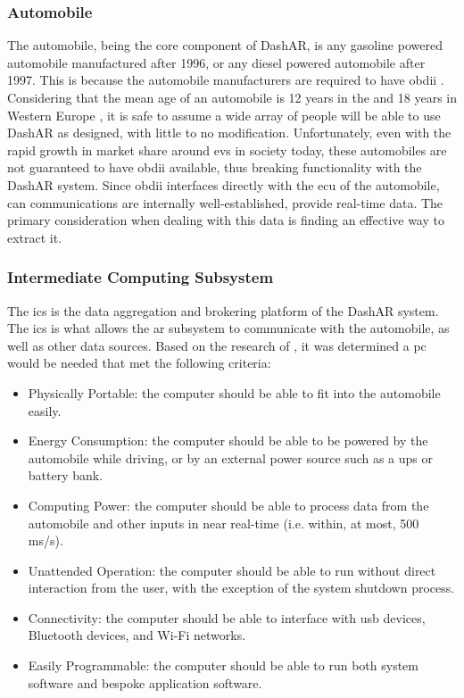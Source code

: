         \subsubsection{Automobile}
            \par The automobile, being the core component of DashAR, is any gasoline powered automobile manufactured after 1996, or any diesel powered automobile after 1997. This is because the automobile manufacturers are required to have \gls{obdii} \cite{CEPA2019}. Considering that the mean age of an automobile is 12 years in the  \cite{BTS2024} and 18 years in Western Europe \cite{Held2021}, it is safe to assume a wide array of people will be able to use DashAR as designed, with little to no modification. Unfortunately, even with the rapid growth in market share around \glspl{ev} in society today, these automobiles are not guaranteed to have \gls{obdii} available, thus breaking functionality with the DashAR system. Since \gls{obdii} interfaces directly with the \gls{ecu} of the automobile, \gls{can} communications are internally well-established, provide real-time data. The primary consideration when dealing with this data is finding an effective way to extract it.

        \subsubsection{Intermediate Computing Subsystem}
            \par The \gls{ics} is the data aggregation and brokering platform of the DashAR system. The \gls{ics} is what allows the \gls{ar} subsystem to communicate with the automobile, as well as other data sources. Based on the research of \cite{Doshi2009}, it was determined a \gls{pc} would be needed that met the following criteria:

            \begin{itemize}
                \item Physically Portable: the computer should be able to fit into the automobile easily.
                \item Energy Consumption: the computer should be able to be powered by the automobile while driving, or by an external power source such as a \gls{ups} or battery bank.
                \item Computing Power: the computer should be able to process data from the automobile and other inputs in near real-time (i.e. within, at most, 500 ms/s).
                \item Unattended Operation: the computer should be able to run without direct interaction from the user, with the exception of the system shutdown process.
                \item Connectivity: the computer should be able to interface with \gls{usb} devices, Bluetooth devices, and Wi-Fi networks.
                \item Easily Programmable: the computer should be able to run both system software and bespoke application software.
            \end{itemize}

